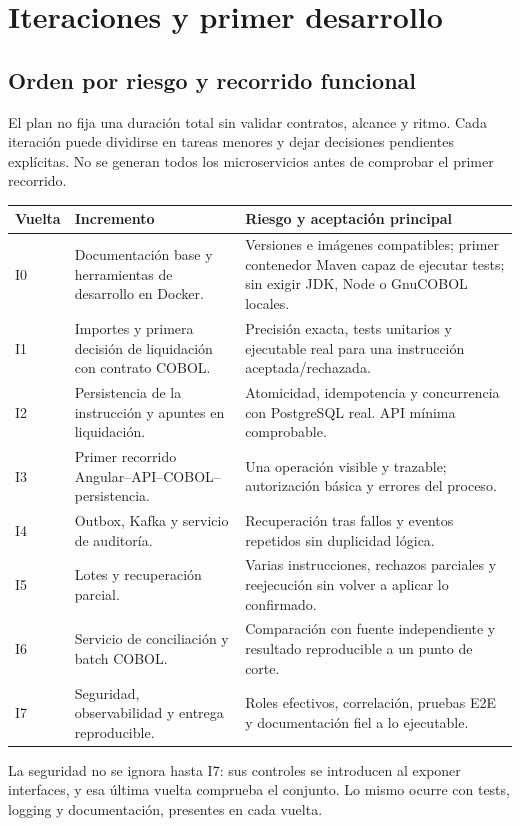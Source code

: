\chapter{Iteraciones y primer desarrollo}
\section{Orden por riesgo y recorrido funcional}
El plan no fija una duración total sin validar contratos, alcance y ritmo. Cada iteración puede dividirse en tareas menores y dejar decisiones pendientes explícitas. No se generan todos los microservicios antes de comprobar el primer recorrido.

\begin{longtable}{L{0.11\textwidth}L{0.37\textwidth}L{0.41\textwidth}}
\textbf{Vuelta} & \textbf{Incremento} & \textbf{Riesgo y aceptación principal}\\\hline
I0 & Documentación base y herramientas de desarrollo en Docker. & Versiones e imágenes compatibles; primer contenedor Maven capaz de ejecutar tests; sin exigir JDK, Node o GnuCOBOL locales.\\
I1 & Importes y primera decisión de liquidación con contrato COBOL. & Precisión exacta, tests unitarios y ejecutable real para una instrucción aceptada/rechazada.\\
I2 & Persistencia de la instrucción y apuntes en liquidación. & Atomicidad, idempotencia y concurrencia con PostgreSQL real. API mínima comprobable.\\
I3 & Primer recorrido Angular--API--COBOL--persistencia. & Una operación visible y trazable; autorización básica y errores del proceso.\\
I4 & Outbox, Kafka y servicio de auditoría. & Recuperación tras fallos y eventos repetidos sin duplicidad lógica.\\
I5 & Lotes y recuperación parcial. & Varias instrucciones, rechazos parciales y reejecución sin volver a aplicar lo confirmado.\\
I6 & Servicio de conciliación y batch COBOL. & Comparación con fuente independiente y resultado reproducible a un punto de corte.\\
I7 & Seguridad, observabilidad y entrega reproducible. & Roles efectivos, correlación, pruebas E2E y documentación fiel a lo ejecutable.\\
\end{longtable}

La seguridad no se ignora hasta I7: sus controles se introducen al exponer interfaces, y esa última vuelta comprueba el conjunto. Lo mismo ocurre con tests, logging y documentación, presentes en cada vuelta.

